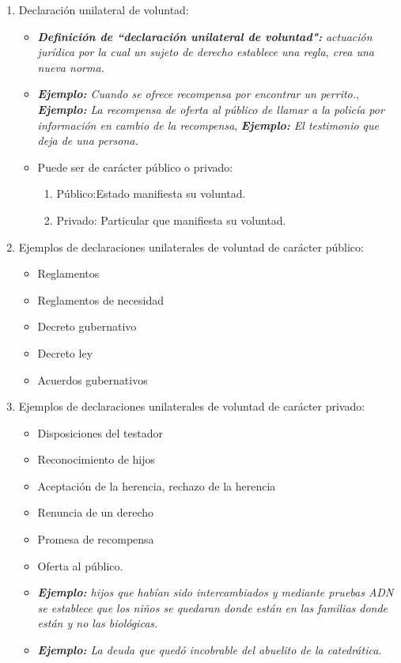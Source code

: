 \begin{enumerate}
    \item Declaración unilateral de voluntad:
        \begin{itemize}
            \item \emph{\textbf{Definición de ``declaración unilateral de voluntad":} actuación jurídica por la cual un sujeto de derecho establece una regla, crea una nueva norma.}
            \item \emph{\textbf{Ejemplo: }Cuando se ofrece recompensa por encontrar un perrito.}, \emph{\textbf{Ejemplo: }La recompensa de oferta al público de llamar a la policía por información en cambio de la recompensa}, \emph{\textbf{Ejemplo: }El testimonio que deja de una persona.}
            \item Puede ser de carácter público o privado:
                \begin{enumerate}
                    \item Público:Estado manifiesta su voluntad.
                    \item Privado: Particular que manifiesta su voluntad.
                \end{enumerate}
        \end{itemize}
    
    \item Ejemplos de declaraciones unilaterales de voluntad de carácter público: 
        \begin{itemize}
            \item Reglamentos 
            \item Reglamentos de necesidad 
            \item Decreto gubernativo 
            \item Decreto ley 
            \item Acuerdos gubernativos 
        \end{itemize}
    
    \item Ejemplos de declaraciones unilaterales de voluntad de carácter privado: 
        \begin{itemize}
            \item Disposiciones del testador 
            \item Reconocimiento de hijos 
            \item Aceptación de la herencia, rechazo de la herencia
            \item Renuncia de un derecho 
            \item Promesa de recompensa 
            \item Oferta al público.
        \end{itemize}
        \begin{itemize}
            \item \emph{\textbf{Ejemplo: }hijos que habían sido intercambiados y mediante pruebas ADN se establece que los niños se quedaran donde están en las familias donde están y no las biológicas.}
            \item \emph{\textbf{Ejemplo: }La deuda que quedó incobrable del abuelito de la catedrática}.
        \end{itemize}
    

\end{enumerate}
